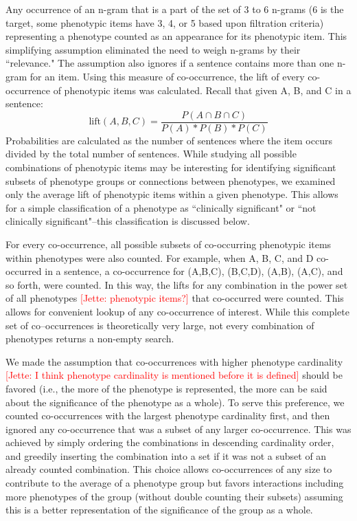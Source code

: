 \documentclass{sig-alternate-05-2015}
\newcommand{\kibitz}[2]{\ifnum\Comments=1\textcolor{#1}{#2}\fi}
\newcommand{\jette}[1]{\kibitz{red}      {[Jette: #1]}}
\begin{document}
Any occurrence of an n-gram that is a part of the set of 3 to 6 n-grams (6 is the target, some phenotypic items have 3, 4, or 5 based upon filtration criteria) representing a phenotype counted as an appearance for its phenotypic item.
This simplifying assumption eliminated the need to weigh n-grams by their ``relevance."	
The assumption also ignores if a sentence contains more than one n-gram for an item.
Using this measure of co-occurrence, the lift of every co-occurrence of phenotypic items was calculated. Recall that given A, B, and C in a sentence:
$$ \text{lift}(A,B,C) = \frac {P(A \cap B \cap C)} {P(A)*P(B)*P(C)}  $$
Probabilities are calculated as the number of sentences where the item occurs divided by the total number of sentences.
While studying all possible combinations of phenotypic items may be interesting for identifying significant subsets of phenotype groups or connections between phenotypes, we examined only the average lift of phenotypic items within a given phenotype.
This allows for a simple classification of a phenotype as ``clinically significant" or ``not clinically significant"--this classification is discussed below.%

For every co-occurrence, all possible subsets of co-occurring phenotypic items within phenotypes were also counted.
For example, when A, B, C, and D co-occurred in a sentence, a co-occurrence for (A,B,C), (B,C,D), (A,B), (A,C), and so forth, were counted.
In this way, the lifts for any combination in the power set of all phenotypes \jette{phenotypic items?} that co-occurred were counted.
This allows for convenient lookup of any co-occurrence of interest.
While this complete set of co--occurrences is theoretically very large, not every combination of phenotypes returns a non-empty search.

We made the assumption that co-occurrences with higher phenotype cardinality \jette{I think phenotype cardinality is mentioned before it is defined} should be favored (i.e., the more of the phenotype is represented, the more can be said about the significance of the phenotype as a whole). 
To serve this preference, we counted co-occurrences with the largest phenotype cardinality first, and then ignored any co-occurrence that was a subset of any larger co-occurrence. This was achieved by simply ordering the combinations in descending cardinality order, and greedily inserting the combination into a set if it was not a subset of an already counted combination. 
This choice allows co-occurrences of any size to contribute to the average of a phenotype group but favors interactions including more phenotypes of the group (without double counting their subsets) assuming this is a better representation of the significance of the group as a whole.
\end{document}
